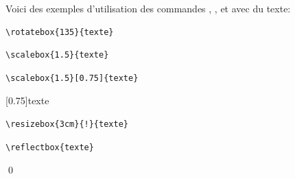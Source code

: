 \begin{exemple}
  Voici des exemples d'utilisation des commandes \cmd{\rotatebox},
  \cmd{\scalebox}, \cmd{\resizebox} et  avec du texte:
  \begin{trivlist}
  \item %
    \begin{minipage}{0.55\linewidth}
\begin{lstlisting}
\rotatebox{135}{texte}
\end{lstlisting}
    \end{minipage}
    \hfill
    \begin{minipage}{0.35\linewidth}
    \end{minipage}
  \item %
    \begin{minipage}{0.55\linewidth}
\begin{lstlisting}
\scalebox{1.5}{texte}
\end{lstlisting}
    \end{minipage}
    \hfill
    \begin{minipage}{0.35\linewidth}
    \end{minipage}
  \item %
    \begin{minipage}{0.55\linewidth}
\begin{lstlisting}
\scalebox{1.5}[0.75]{texte}
\end{lstlisting}
    \end{minipage}
    \hfill
    \begin{minipage}{0.35\linewidth}
      \scalebox{1.5}[0.75]{texte}
    \end{minipage}
  \item %
    \begin{minipage}{0.55\linewidth}
\begin{lstlisting}
\resizebox{3cm}{!}{texte}
\end{lstlisting}
    \end{minipage}
    \hfill
    \begin{minipage}{0.35\linewidth}
    \end{minipage}
  \item %
    \begin{minipage}{0.55\linewidth}
\begin{lstlisting}
\reflectbox{texte}
\end{lstlisting}
    \end{minipage}
    \hfill
    \begin{minipage}{0.35\linewidth}
    \end{minipage}
  \end{trivlist}
  \qed
\end{exemple}



